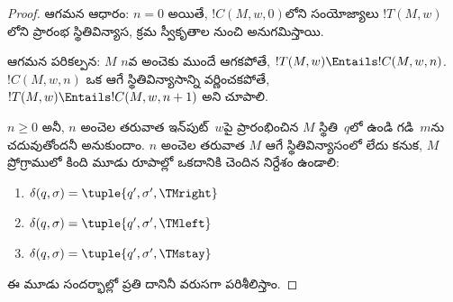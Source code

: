 \documentclass[../../../include/open-logic-section]{subfiles}
\begin{document}
\begin{proof}
ఆగమన ఆధారం: $n=0$ అయితే, $!C(M,w,0)$లోని సంయోజ్యాలు
$!T(M,w)$లోని ప్రారంభ స్థితివిన్యాస, క్రమ స్వీకృతాల నుంచి అనుగమిస్తాయి.

ఆగమన పరికల్పన: $M$ $n$వ అంచెకు ముందే ఆగకపోతే,
$!T(M,w) \Entails !C(M,w,n)$. $!C(M,w,n)$ ఒక ఆగే స్థితివిన్యాసాన్ని
వర్ణించకపోతే, $!T(M,w) \Entails !C(M,w,n+1)$ అని చూపాలి.

$n \ge 0$ అనీ, $n$ అంచెల తరువాత ఇన్‌పుట్~$w$పై ప్రారంభించిన $M$ స్థితి~$q$లో
ఉండి గడి~$m$ను చదువుతోందనీ అనుకుందాం. $n$ అంచెల తరువాత $M$ ఆగే స్థితివిన్యాసంలో లేదు కనుక,
$M$ ప్రోగ్రాములో కింది మూడు రూపాల్లో ఒకదానికి చెందిన నిర్దేశం ఉండాలి:

\begin{enumerate}
\item {} $\delta(q, \sigma) = \tuple{q', \sigma', \TMright}$

\item {} $\delta(q, \sigma) = \tuple{q', \sigma', \TMleft}$

\item {} $\delta(q, \sigma) = \tuple{q', \sigma', \TMstay}$
\end{enumerate}

ఈ మూడు సందర్భాల్లో ప్రతి దానినీ వరుసగా పరిశీలిస్తాం.


\end{proof}
\end{document}

